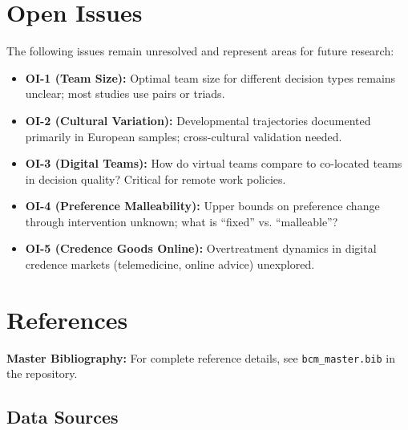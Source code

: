 \section{Open Issues}
\label{sec:sut-open-issues}

The following issues remain unresolved and represent areas for future research:

\begin{itemize}
    \item \textbf{OI-1 (Team Size):} Optimal team size for different decision
    types remains unclear; most studies use pairs or triads.

    \item \textbf{OI-2 (Cultural Variation):} Developmental trajectories documented
    primarily in European samples; cross-cultural validation needed.

    \item \textbf{OI-3 (Digital Teams):} How do virtual teams compare to co-located
    teams in decision quality? Critical for remote work policies.

    \item \textbf{OI-4 (Preference Malleability):} Upper bounds on preference change
    through intervention unknown; what is ``fixed'' vs. ``malleable''?

    \item \textbf{OI-5 (Credence Goods Online):} Overtreatment dynamics in digital
    credence markets (telemedicine, online advice) unexplored.
\end{itemize}


\section{References}
\label{sec:sut-references}

\begin{tcolorbox}[colback=blue!5!white, colframe=blue!75!black]
\textbf{Master Bibliography:} For complete reference details, see
\texttt{bcm\_master.bib} in the repository.
\end{tcolorbox}

\subsection{Data Sources}

